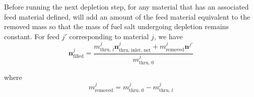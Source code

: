 Before running the next depletion step, for any material that has an associated
feed material defined, \SaltProc will add an amount of the feed material
equivalent to the removed mass so that the mass of fuel salt undergoing depletion
remains constant. For feed $j'$ corresponding to material $j$, we have
\begin{equation}
    \mathbf{n}^{j}_\text{filled} = \frac{m^{j}_{\text{thru, }l}\mathbf{n}^{j}_\text{thru, inlet, net} +  m^{j}_{\text{removed}}\mathbf{n}^{j'}}{m^{j}_{\text{thru, }0}}
\end{equation}

where 
\begin{equation}
    m^{j}_\text{removed} = m^{j}_{\text{thru, }0} - m^{j}_{\text{thru, }l}
\end{equation}
